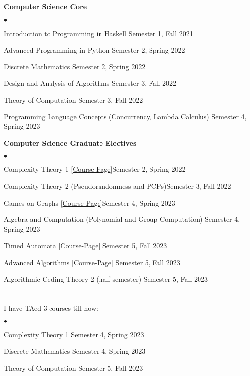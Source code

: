 \documentclass[margin,line, 10pt]{res}
\newenvironment{list2}{
  \begin{list}{$\bullet$}{%
      \setlength{\itemsep}{0in}
      \setlength{\parsep}{0in} \setlength{\parskip}{0in}
      \setlength{\topsep}{0in} \setlength{\partopsep}{0in} 
      \setlength{\leftmargin}{0.2in}}}{\end{list}}
\begin{document}
\begin{resume}
{\bf Computer Science Core}
\begin{list2}
    \item Introduction to Programming in Haskell \hfill Semester 1, Fall 2021
    \item Advanced Programming in Python \hfill Semester 2, Spring 2022
    \item Discrete Mathematics \hfill Semester 2, Spring 2022
    \item Design and Analysis of Algorithms \hfill Semester 3, Fall 2022
    \item Theory of Computation \hfill Semester 3, Fall 2022
    \item Programming Language Concepts (Concurrency, Lambda Calculus) \hfill Semester 4, Spring 2023
\end{list2}

{\bf Computer Science Graduate Electives}
\begin{list2}
    \item Complexity Theory 1 \hspace{0.4em} [\href{https://www.cmi.ac.in/~prajakta/courses/s2022/index.html}{Course-Page}]\hfill Semester 2, Spring 2022
    \item Complexity Theory 2 (Pseudorandomness and PCPs)\hfill Semester 3, Fall 2022
    \item Games on Graphs \hspace{0.4em} [\href{https://www.cmi.ac.in/~sri/Courses/GGRP/2023/index.html}{Course-Page}]\hfill Semester 4, Spring 2023
    \item Algebra and Computation (Polynomial and Group Computation) \hfill Semester 4, Spring 2023
    \item Timed Automata \hspace{0.4em} [\href{https://www.cmi.ac.in/~sri/Courses/TA/2023/index.html}{Course-Page}] \hfill Semester 5, Fall 2023
    \item Advanced Algorithms \hspace{0.4em} [\href{https://www.cmi.ac.in/~prajakta/courses/f2023/index.html}{Course-Page}] \hfill Semester 5, Fall 2023
    \item Algorithmic Coding Theory 2 (half semester) \hfill Semester 5, Fall 2023
\end{list2}

\section{}\label{sec: TA}
I have TAed 3 courses till now:
\begin{list2}
    \item Complexity Theory 1 \hfill Semester 4, Spring 2023
    \item Discrete Mathematics \hfill Semester 4, Spring 2023
    \item Theory of Computation \hfill Semester 5, Fall 2023
\end{list2}



\end{resume}
\end{document}
